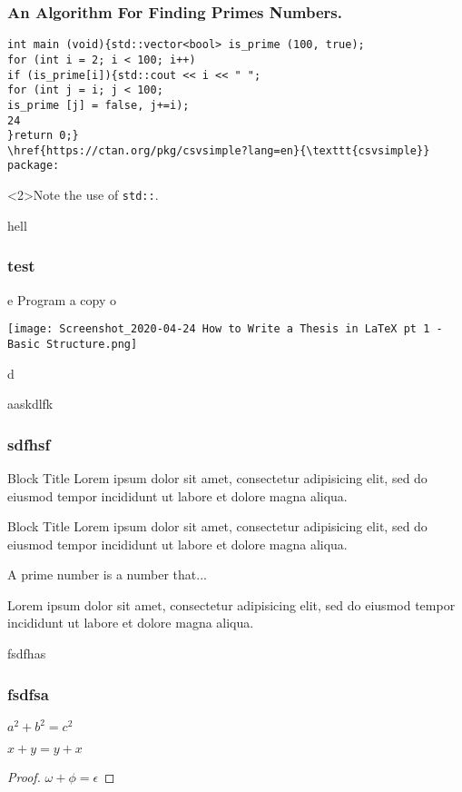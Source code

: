 \documentclass{beamer}
\begin{document}
\begin{frame}[fragile]
\frametitle{An Algorithm For Finding Primes Numbers.}
\begin{verbatim}
int main (void){std::vector<bool> is_prime (100, true);
for (int i = 2; i < 100; i++)
if (is_prime[i]){std::cout << i << " ";
for (int j = i; j < 100; 
is_prime [j] = false, j+=i);
24
}return 0;}
\href{https://ctan.org/pkg/csvsimple?lang=en}{\texttt{csvsimple}} package:
\end{verbatim}
\begin{uncoverenv}<2>Note the use of 
\verb|std::|.
\end{uncoverenv}
\end{frame}
 \begin{frame}{hell}
 \frametitle{test}
 \begin{flushleft}
 
 
 
e Program a copy o
 
 
 \texttt{[image: Screenshot\_2020-04-24 How to Write a Thesis in LaTeX pt 1 - Basic Structure.png]}
 \end{flushleft}
d%
 \end{frame}
 
 \begin{frame}{aaskdlfk}
 \frametitle{sdfhsf}
 \begin{block}{Block Title}
Lorem ipsum dolor sit amet, consectetur adipisicing elit, 
sed do eiusmod tempor incididunt ut labore et 
dolore magna aliqua.
\end{block}
\begin{alertblock}{Block Title}
Lorem ipsum dolor sit amet, consectetur adipisicing elit, 
sed do eiusmod tempor incididunt ut labore et 
dolore magna aliqua.

\end{alertblock}
     \begin{definition}
A prime number is a number that...
\end{definition}

\begin{example}
Lorem ipsum dolor sit amet, consectetur adipisicing elit, 
sed do eiusmod tempor incididunt ut labore et
dolore magna aliqua.
\end{example}

 \end{frame}
 
 
 \begin{frame}{fsdfhas}
 \frametitle{fsdfsa}
 \begin{theorem}[Pythagoras] 
$ a^2 + b^2 = c^2$
\end{theorem}
\begin{corollary}
$ x + y = y + x  $
\end{corollary}
\begin{proof}
$\omega +\phi = \epsilon $
\end{proof}
     
 \end{frame}
 
\end{document}
